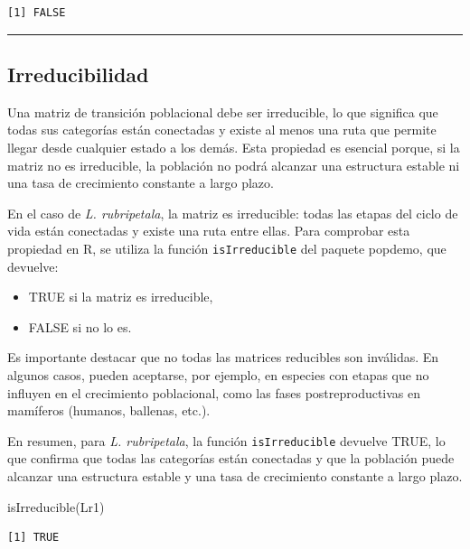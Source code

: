 \documentclass[
  12pt,
  letterpaper,
]{book}
\newenvironment{Shaded}{\begin{snugshade}}{\end{snugshade}}
\newcommand{\FunctionTok}[1]{\textcolor[rgb]{0.28,0.35,0.67}{#1}}
\newcommand{\NormalTok}[1]{\textcolor[rgb]{0.00,0.23,0.31}{#1}}
\providecommand{\tightlist}{%
  \setlength{\itemsep}{0pt}\setlength{\parskip}{0pt}}\usepackage{longtable,booktabs,array}
\begin{document}
\begin{verbatim}
[1] FALSE
\end{verbatim}

\begin{center}\rule{0.5\linewidth}{0.5pt}\end{center}

\subsection{Irreducibilidad}\label{irreducibilidad}

Una matriz de transición poblacional debe ser irreducible, lo que
significa que todas sus categorías están conectadas y existe al menos
una ruta que permite llegar desde cualquier estado a los demás. Esta
propiedad es esencial porque, si la matriz no es irreducible, la
población no podrá alcanzar una estructura estable ni una tasa de
crecimiento constante a largo plazo.

En el caso de \emph{L. rubripetala}, la matriz es irreducible: todas las
etapas del ciclo de vida están conectadas y existe una ruta entre ellas.
Para comprobar esta propiedad en R, se utiliza la función
\texttt{isIrreducible} del paquete popdemo, que devuelve:

\begin{itemize}
\tightlist
\item
  TRUE si la matriz es irreducible,
\item
  FALSE si no lo es.
\end{itemize}

Es importante destacar que no todas las matrices reducibles son
inválidas. En algunos casos, pueden aceptarse, por ejemplo, en especies
con etapas que no influyen en el crecimiento poblacional, como las fases
postreproductivas en mamíferos (humanos, ballenas, etc.).

En resumen, para \emph{L. rubripetala}, la función
\texttt{isIrreducible} devuelve TRUE, lo que confirma que todas las
categorías están conectadas y que la población puede alcanzar una
estructura estable y una tasa de crecimiento constante a largo plazo.

\begin{Shaded}
\begin{Highlighting}[]
\FunctionTok{isIrreducible}\NormalTok{(Lr1)}
\end{Highlighting}
\end{Shaded}

\begin{verbatim}
[1] TRUE
\end{verbatim}
\end{document}
